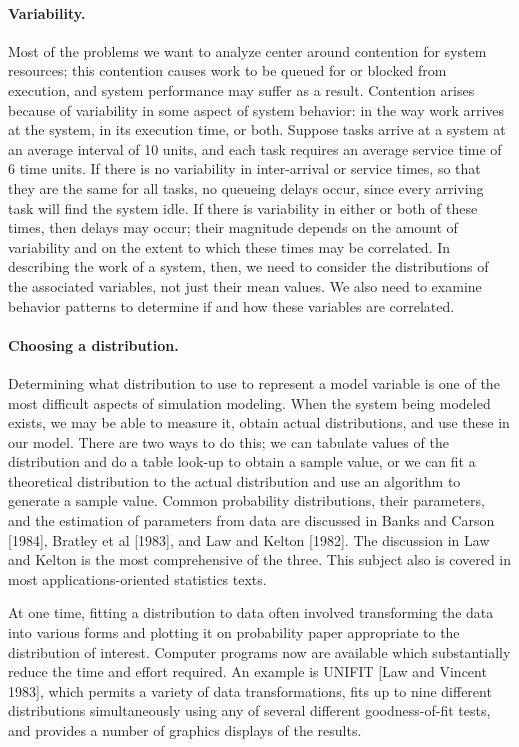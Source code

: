 \paragraph{Variability.}
Most of the problems we want to analyze center around contention for system
resources; this contention causes work to be queued for or blocked from
execution, and system performance may suffer as a result. Contention arises
because of variability in some aspect of system behavior: in the way work
arrives at the system, in its execution time, or both. Suppose tasks arrive at a
system at an average interval of 10 units, and each task requires an average
service time of 6 time units. If there is no variability in inter-arrival or
service times, so that they are the same for all tasks, no queueing delays
occur, since every arriving task will find the system idle. If there is
variability in either or both of these times, then delays may occur; their
magnitude depends on the amount of variability and on the extent to which
these times may be correlated. In describing the work of a system, then, we
need to consider the distributions of the associated variables, not just their
mean values. We also need to examine behavior patterns to determine if and how
these variables are correlated.

\paragraph{Choosing a distribution.}
Determining what distribution to use to represent a model variable is one of
the most difficult aspects of simulation modeling. When the system being
modeled exists, we may be able to measure it, obtain actual distributions, and
use these in our model. There are two ways to do this; we can tabulate values
of the distribution and do a table look-up to obtain a sample value, or we can
fit a theoretical distribution to the actual distribution and use an algorithm
to generate a sample value. Common probability distributions, their
parameters, and the estimation of parameters from data are discussed in Banks
and Carson [1984], Bratley et al [1983], and Law and Kelton [1982]. The
discussion in Law and Kelton is the most comprehensive of the three. This
subject also is covered in most applications-oriented statistics texts.

At one time, fitting a distribution to data often involved transforming the
data into various forms and plotting it on probability paper appropriate to the
distribution of interest. Computer programs now are available which
substantially reduce the time and effort required. An example is UNIFIT [Law
and Vincent 1983], which permits a variety of data transformations, fits up to
nine different distributions simultaneously using any of several different
goodness-of-fit tests, and provides a number of graphics displays of the
results.

